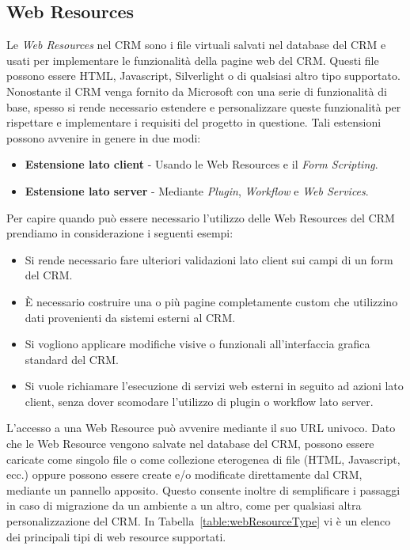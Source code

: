 \subsection{Web Resources}
 Le \textit{Web Resources} nel CRM sono i file virtuali salvati nel database del CRM e usati per implementare le funzionalità della pagine web del CRM. Questi file possono essere HTML, Javascript, Silverlight o di qualsiasi altro tipo supportato. 
 Nonostante il CRM venga fornito da Microsoft con una serie di funzionalità di base, spesso si rende necessario estendere e personalizzare queste funzionalità per rispettare e implementare i requisiti del progetto in questione. Tali estensioni possono avvenire in genere in due modi:
 \begin{itemize}
   \item \textbf{Estensione lato client} - Usando le Web Resources e il \textit{Form Scripting}.
   \item \textbf{Estensione lato server} - Mediante \textit{Plugin}, \textit{Workflow} e \textit{Web Services}.
 \end{itemize}

Per capire quando può essere necessario l'utilizzo delle Web Resources del CRM prendiamo in considerazione i seguenti esempi: 
\begin{itemize}
  \item Si rende necessario fare ulteriori validazioni lato client sui campi di un form del CRM.
  \item È necessario costruire una o più pagine completamente custom che utilizzino dati provenienti da sistemi esterni al CRM.
  \item Si vogliono applicare modifiche visive o funzionali all'interfaccia grafica standard del CRM.
  \item Si vuole richiamare l'esecuzione di servizi web esterni in seguito ad azioni lato client, senza dover scomodare l'utilizzo di plugin o workflow lato server.
\end{itemize}

L'accesso a una Web Resource può avvenire mediante il suo URL univoco. Dato che le Web Resource vengono salvate nel database del CRM, possono essere caricate come singolo file o come collezione eterogenea di file (HTML, Javascript, ecc.) oppure possono essere create e/o modificate direttamente dal CRM, mediante un pannello apposito. Questo consente inoltre di semplificare i passaggi in caso di migrazione da un ambiente a un altro, come per qualsiasi altra personalizzazione del CRM. In Tabella~\ref{table:webResourceType} vi è un elenco dei principali tipi di web resource supportati.

